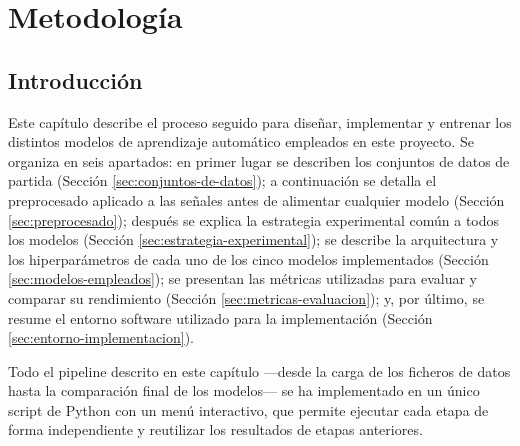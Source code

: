%
%
%
%
%
%
%
%

\chapter{Metodología}
\label{cha:metodologia}


\section{Introducción}
\label{sec:introduccion-desarrollo}

Este capítulo describe el proceso seguido para diseñar, implementar y entrenar los distintos modelos de aprendizaje automático empleados en este proyecto. 
Se organiza en seis apartados: en primer lugar se describen los conjuntos de datos de partida (Sección \ref{sec:conjuntos-de-datos}); a continuación se 
detalla el preprocesado aplicado a las señales antes de alimentar cualquier modelo (Sección \ref{sec:preprocesado}); después se explica la estrategia experimental
común a todos los modelos (Sección \ref{sec:estrategia-experimental}); se describe la arquitectura y los hiperparámetros de cada uno de los cinco modelos implementados (Sección \ref{sec:modelos-empleados}); 
se presentan las métricas utilizadas para evaluar y comparar su rendimiento (Sección \ref{sec:metricas-evaluacion}); y, por último, se resume el entorno software utilizado para la implementación (Sección \ref{sec:entorno-implementacion}).

Todo el pipeline descrito en este capítulo —desde la carga de los ficheros de datos hasta la comparación final de los modelos— se ha implementado en un único script de Python con un menú interactivo, que permite ejecutar cada etapa
de forma independiente y reutilizar los resultados de etapas anteriores.


